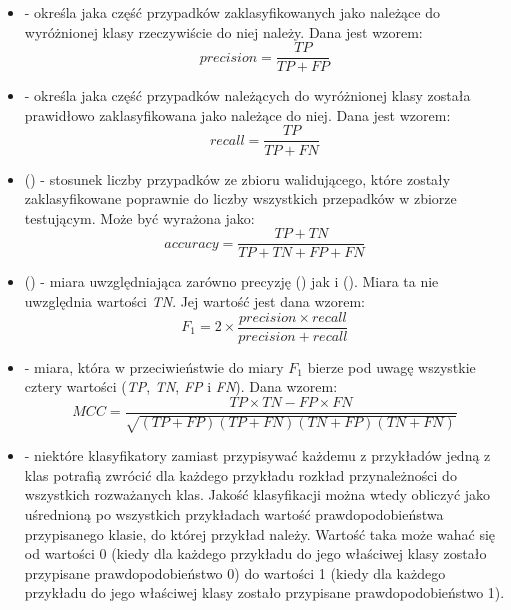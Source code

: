 	\begin{itemize}
		\item {} - określa jaka część przypadków zaklasyfikowanych jako należące do wyróżnionej klasy rzeczywiście do niej należy. Dana jest wzorem:
		 $$ precision = \frac{TP}{TP+FP} $$
		
		\item {} - określa jaka część przypadków należących do wyróżnionej klasy została prawidłowo zaklasyfikowana jako należące do niej. Dana jest wzorem:
		$$ recall = \frac{TP}{TP+FN} $$

		\item {} () - stosunek liczby przypadków ze zbioru walidującego, które zostały zaklasyfikowane poprawnie do liczby wszystkich przepadków w zbiorze testującym. Może być wyrażona jako:
		$$ accuracy = \frac{TP+TN}{TP+TN+FP+FN} $$

		\item {} () - 	miara uwzględniająca zarówno precyzję () jak i  (). Miara ta nie uwzględnia wartości \emph{TN}. Jej wartość jest dana wzorem:
		$$ F_{1} = 2 \times \frac{precision \times recall}{precision + recall} $$
		 
		
		\item {} - miara, która w przeciwieństwie do miary $ F_{1} $ bierze pod uwagę wszystkie cztery wartości (\emph{TP}, \emph{TN}, \emph{FP} i \emph{FN}). Dana wzorem: 
		$$ MCC = \frac{ TP \times TN - FP \times FN } {\sqrt{ (TP + FP) ( TP + FN ) ( TN + FP ) ( TN + FN ) } } $$
		
		\item {} - niektóre klasyfikatory zamiast przypisywać każdemu z przykładów jedną z klas potrafią zwrócić dla każdego przykładu rozkład przynależności do wszystkich rozważanych klas. Jakość klasyfikacji można wtedy obliczyć jako uśrednioną po wszystkich przykładach wartość prawdopodobieństwa przypisanego klasie, do której przykład należy. Wartość taka może wahać się od wartości 0 (kiedy dla każdego przykładu do jego właściwej klasy zostało przypisane prawdopodobieństwo 0) do wartości 1 (kiedy dla każdego przykładu do jego właściwej klasy zostało przypisane prawdopodobieństwo 1).
		
	\end{itemize}

